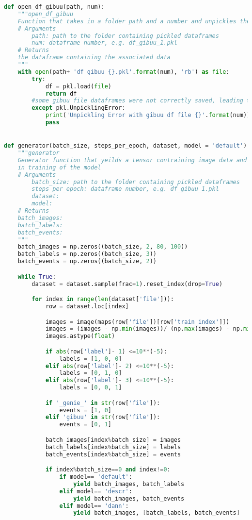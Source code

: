 \begin{lstlisting}[language=Python]
def open_df_gibuu(path, num):
    """open_df_gibuu
    Function that takes in a folder path and a number and unpickles the assosiated dataframe
    # Arguments
        path: path to the folder containing pickled dataframes
        num: dataframe number, e.g. df_gibuu_1.pkl
    # Returns
	the dataframe containing the associated data
    """
    with open(path+ 'df_gibuu_{}.pkl'.format(num), 'rb') as file:
        try:
            df = pkl.load(file)
            return df
        #some gibuu file dataframes were not correctly saved, leading to Unpickling Errors
        except pkl.UnpicklingError:
            print('Unpickling Error with gibuu df file {}'.format(num))
            pass


def generator(batch_size, steps_per_epoch, dataset, model = 'default'):
    """generator
    Generator function that yeilds a tensor contraining image data and the associated lables to be called by the keras 
    in training of the model
    # Arguments
        batch_size: path to the folder containing pickled dataframes
        steps_per_epoch: dataframe number, e.g. df_gibuu_1.pkl
        dataset: 
        model: 
    # Returns
	batch_images:
	batch_labels:
	batch_events: 
    """
    batch_images = np.zeros((batch_size, 2, 80, 100))
    batch_labels = np.zeros((batch_size, 3))
    batch_events = np.zeros((batch_size, 2))

    while True:
        dataset = dataset.sample(frac=1).reset_index(drop=True)

        for index in range(len(dataset['file'])):
            row = dataset.loc[index]

            images = image(maps(row['file'])[row['train_index']])
            images = (images - np.min(images))/ (np.max(images) - np.min(images))
            images.astype(float)

            if abs(row['label']- 1) <=10**(-5):
                labels = [1, 0, 0]
            elif abs(row['label']- 2) <=10**(-5):
                labels = [0, 1, 0]
            elif abs(row['label']- 3) <=10**(-5):
                labels = [0, 0, 1]

            if '_genie_' in str(row['file']):
                events = [1, 0]
            elif 'gibuu' in str(row['file']):
                events = [0, 1]

            batch_images[index%batch_size] = images
            batch_labels[index%batch_size] = labels
            batch_events[index%batch_size] = events

            if index%batch_size==0 and index!=0:
                if model== 'default':
                    yield batch_images, batch_labels
                elif model== 'descr':
                    yield batch_images, batch_events
                elif model== 'dann':
                    yield batch_images, [batch_labels, batch_events]
          




\end{lstlisting}
